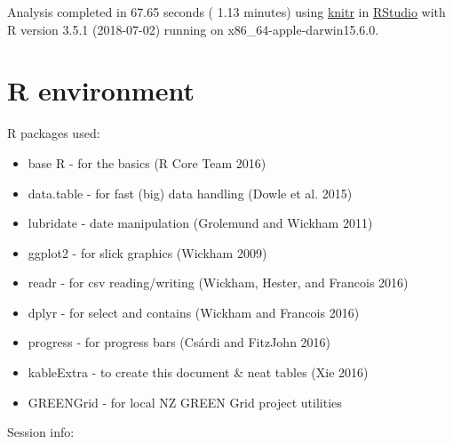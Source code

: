 \documentclass[]{article}
\providecommand{\tightlist}{%
  \setlength{\itemsep}{0pt}\setlength{\parskip}{0pt}}
\theoremstyle{definition}
\theoremstyle{definition}
\theoremstyle{definition}
\theoremstyle{remark}
\begin{document}
Analysis completed in 67.65 seconds ( 1.13 minutes) using
\href{https://cran.r-project.org/package=knitr}{knitr} in
\href{http://www.rstudio.com}{RStudio} with R version 3.5.1 (2018-07-02)
running on x86\_64-apple-darwin15.6.0.

\section{R environment}\label{r-environment}

R packages used:

\begin{itemize}
\tightlist
\item
  base R - for the basics (R Core Team 2016)
\item
  data.table - for fast (big) data handling (Dowle et al. 2015)
\item
  lubridate - date manipulation (Grolemund and Wickham 2011)
\item
  ggplot2 - for slick graphics (Wickham 2009)
\item
  readr - for csv reading/writing (Wickham, Hester, and Francois 2016)
\item
  dplyr - for select and contains (Wickham and Francois 2016)
\item
  progress - for progress bars (Csárdi and FitzJohn 2016)
\item
  kableExtra - to create this document \& neat tables (Xie 2016)
\item
  GREENGrid - for local NZ GREEN Grid project utilities
\end{itemize}

Session info:
\end{document}
